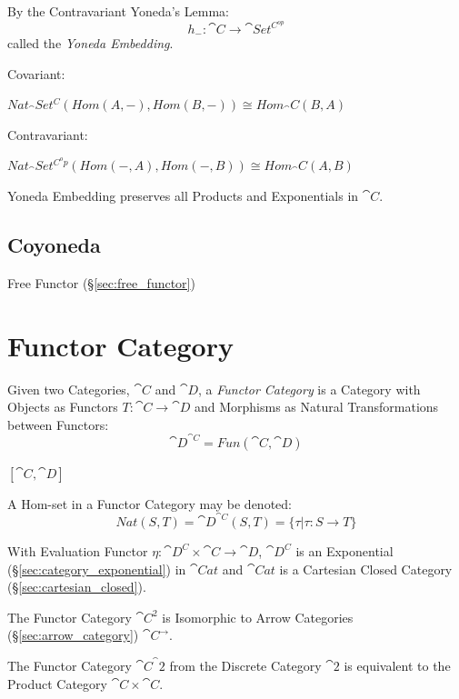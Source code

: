 By the Contravariant Yoneda's Lemma:
\[
  h_-: \cat{C} \rightarrow \cat{Set^{C^{op}}}
\]
called the \emph{Yoneda Embedding}.

Covariant:

$Nat_\cat{Set^C}(Hom(A,-), Hom(B,-)) \cong Hom_\cat{C}(B,A)$

Contravariant:

$Nat_\cat{Set^{C^op}}(Hom(-,A), Hom(-,B)) \cong Hom_\cat{C}(A,B)$

Yoneda Embedding preserves all Products and Exponentials in
$\cat{C}$.



\subsection{Coyoneda}\label{sec:coyoneda}

Free Functor (\S\ref{sec:free_functor})



\section{Functor Category}\label{sec:functor_category}

Given two Categories, $\cat{C}$ and $\cat{D}$, a \emph{Functor
  Category} is a Category with Objects as Functors $T : \cat{C}
\rightarrow \cat{D}$ and Morphisms as Natural Transformations
between Functors:
\[
  \cat{D}^{\cat{C}} = Fun(\cat{C},\cat{D})
\]

$[\cat{C},\cat{D}]$

A Hom-set in a Functor Category may be denoted:
\[
  Nat(S,T) = \cat{D}^{\cat{C}}(S,T) =
    \{ \tau | \tau : S \rightarrow T \}
\]

With Evaluation Functor $\eta : \cat{D^C} \times \cat{C} \rightarrow
\cat{D}$, $\cat{D^C}$ is an Exponential
(\S\ref{sec:category_exponential}) in $\cat{Cat}$ and $\cat{Cat}$ is a
Cartesian Closed Category (\S\ref{sec:cartesian_closed}).

The Functor Category $\cat{C^2}$ is Isomorphic to Arrow Categories
(\S\ref{sec:arrow_category}) $\cat{C}^\rightarrow$.

The Functor Category $\cat{C}^\cat{2}$ from the Discrete Category
$\cat{2}$ is equivalent to the Product Category $\cat{C} \times
\cat{C}$.

